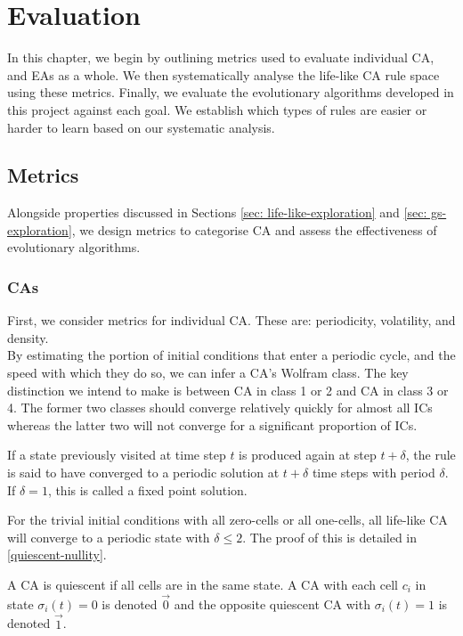 \chapter{Evaluation} \label{evaluation}

In this chapter, we begin by outlining metrics used to evaluate individual CA, and EAs as a whole. We then systematically analyse the life-like CA rule space using these metrics. Finally, we evaluate the evolutionary algorithms developed in this project against each goal. We establish which types of rules are easier or harder to learn based on our systematic analysis. 

\section{Metrics}
Alongside properties discussed in Sections \ref{sec: life-like-exploration} and \ref{sec: gs-exploration}, we design metrics to categorise CA and assess the effectiveness of evolutionary algorithms.

\subsection{CAs}
First, we consider metrics for individual CA. These are: periodicity, volatility, and density.\\

By estimating the portion of initial conditions that enter a periodic cycle, and the speed with which they do so, we can infer a CA's Wolfram class. The key distinction we intend to make is between CA in class 1 or 2 and CA in class 3 or 4. The former two classes should converge relatively quickly for almost all ICs whereas the latter two will not converge for a significant proportion of ICs.

\begin{definition}
 If a state previously visited at time step $t$ is produced again at step $t+\delta$, the rule is said to have converged to a periodic solution at $t+\delta$ time steps with period $\delta$. If $\delta = 1$, this is called a fixed point solution. 
\end{definition}

For the trivial initial conditions with all zero-cells or all one-cells, all life-like CA will converge to a periodic state with $\delta \leq 2$. The proof of this is detailed in \ref{quiescent-nullity}.

\begin{definition}[Quiescence]
A CA is quiescent if all cells are in the same state. A CA with each cell $c_i$ in state $\sigma_i(t) = 0$ is denoted $\vec{0}$ and the opposite quiescent CA with $\sigma_i(t) = 1$ is denoted $\vec{1}$. 
\end{definition}

